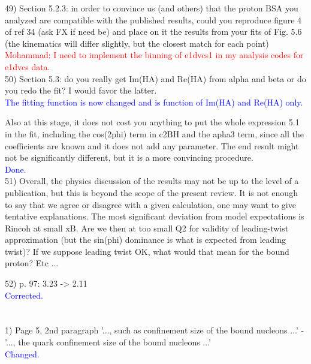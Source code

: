 49) Section 5.2.3: in order to convince us (and others) that the proton BSA you 
analyzed are compatible with the published results, could you reproduce figure 
4 of ref 34 (ask FX if need be) and place on it the results from your fits of 
Fig. 5.6 (the kinematics will differ slightly, but the closest match for each 
point)\\
\textcolor{red}{Mohammad: I need to implement the binning of e1dvcs1 in my 
analysis codes for e1dvcs data.}\\ 

50) Section 5.3: do you really get Im(HA) and Re(HA) from alpha and beta or do 
you redo the fit? I would favor the latter.  \\
\textcolor{blue}{ The fitting function is now changed and is function of
Im(HA) and Re(HA) only.} 

Also at this stage, it does not cost you anything to put the whole expression 
5.1 in the fit, including the cos(2phi) term in c2BH and the apha3 term, since 
all the coefficients are known and it does not add any parameter. The end 
result might not be significantly different, but it is a more convincing 
procedure. \\
\textcolor{blue}{Done.}\\

51) Overall, the physics discussion of the results may not be up to the level of a 
publication, but this is beyond the scope of the present review. It is not 
enough to say that we agree or disagree with a given calculation, one may want 
to give tentative explanations. The most significant deviation from model 
expectations is R{incoh} at small xB. Are we then at too small Q2 for validity 
of leading-twist approximation (but the sin(phi) dominance is what is expected 
from leading twist)? If we suppose leading twist OK, what would that mean for 
the bound proton? Etc ...

52) p. 97: 3.23 -> 2.11 \\
\textcolor{blue}{ Corrected.}\\

\section*{}

1) Page 5, 2nd paragraph
'..., such as confinement size of the bound nucleons ...' - '..., the quark 
confinement size of the bound nucleons ...' \\
\textcolor{blue}{ Changed.}\\

